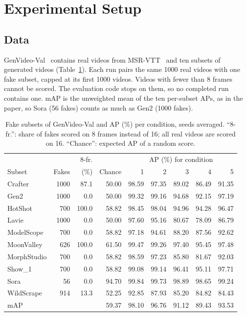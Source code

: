 \documentclass[conference]{IEEEtran}
\begin{document}
\section{Experimental Setup}
\label{sec:setup}

\subsection{Data}

GenVideo-Val~\cite{chen2024demamba} contains real videos from
MSR-VTT~\cite{xu2016msrvtt} and ten subsets of generated videos
(Table~\ref{tab:subsets}). Each run pairs the same 1000 real videos with one
fake subset, capped at its first 1000 videos. Videos with fewer than 8 frames
cannot be scored. The evaluation code stops on them, so no completed run
contains one. mAP is the unweighted mean of the ten per-subset APs, as in the
paper, so Sora (56 fakes) counts as much as Gen2 (1000 fakes).

\begin{table}[t]
\caption{Fake subsets of GenVideo-Val and AP (\%) per condition, seeds
averaged. ``8-fr.'': share of fakes scored on 8 frames instead of 16; all real
videos are scored on 16. ``Chance'': expected AP of a random score.}
\label{tab:subsets}
\centering
\footnotesize
\setlength{\tabcolsep}{2.5pt}
\begin{tabular}{@{}lrrr|rrrrr@{}}
\toprule
 & & 8-fr. & & \multicolumn{5}{c}{AP (\%) for condition} \\
Subset & Fakes & (\%) & Chance & 1 & 2 & 3 & 4 & 5 \\
\midrule
Crafter     & 1000 &  87.1 & 50.00 & 98.59 & 97.35 & 89.02 & 86.49 & 91.35 \\
Gen2        & 1000 &   0.0 & 50.00 & 99.32 & 99.16 & 94.68 & 92.15 & 97.19 \\
HotShot     &  700 & 100.0 & 58.82 & 98.45 & 98.04 & 94.96 & 94.28 & 96.47 \\
Lavie       & 1000 &   0.0 & 50.00 & 97.60 & 95.16 & 80.67 & 78.09 & 86.79 \\
ModelScope  &  700 &   0.0 & 58.82 & 97.18 & 94.61 & 88.20 & 87.56 & 92.62 \\
MoonValley  &  626 & 100.0 & 61.50 & 99.47 & 99.26 & 97.40 & 95.45 & 97.48 \\
MorphStudio &  700 &   0.0 & 58.82 & 98.59 & 97.23 & 85.80 & 81.67 & 92.03 \\
Show\_1     &  700 &   0.0 & 58.82 & 99.08 & 99.14 & 96.41 & 95.11 & 97.71 \\
Sora        &   56 &   0.0 & 94.70 & 99.84 & 99.73 & 98.89 & 98.65 & 99.24 \\
WildScrape  &  914 &  13.3 & 52.25 & 92.85 & 87.93 & 85.20 & 84.82 & 84.43 \\
\midrule
mAP         &      &       & 59.37 & 98.10 & 96.76 & 91.12 & 89.43 & 93.53 \\
\bottomrule
\end{tabular}
\end{table}
\end{document}
